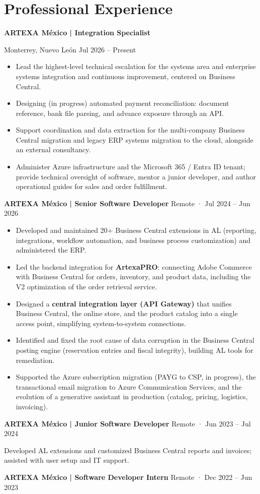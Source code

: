\documentclass[10pt,letterpaper]{article}
\begin{document}
\section{Professional Experience}
\textbf{ARTEXA México | Integration Specialist}\par
Monterrey, Nuevo León \hfill Jul 2026 -- Present\par
\begin{itemize}
\item Lead the highest-level technical escalation for the systems area and enterprise systems integration and continuous improvement, centered on Business Central.
\item Designing (in progress) automated payment reconciliation: document reference, bank file parsing, and advance exposure through an API.
\item Support coordination and data extraction for the multi-company Business Central migration and legacy ERP systems migration to the cloud, alongside an external consultancy.
\item Administer Azure infrastructure and the Microsoft 365 / Entra ID tenant; provide technical oversight of software, mentor a junior developer, and author operational guides for sales and order fulfillment.
\end{itemize}
\textbf{ARTEXA México | Senior Software Developer} \hfill Remote · Jul 2024 -- Jun 2026
\begin{itemize}
\item Developed and maintained 20+ Business Central extensions in AL (reporting, integrations, workflow automation, and business process customization) and administered the ERP.
\item Led the backend integration for \textbf{ArtexaPRO}: connecting Adobe Commerce with Business Central for orders, inventory, and product data, including the V2 optimization of the order retrieval service.
\item Designed a \textbf{central integration layer (API Gateway)} that unifies Business Central, the online store, and the product catalog into a single access point, simplifying system-to-system connections.
\item Identified and fixed the root cause of data corruption in the Business Central posting engine (reservation entries and fiscal integrity), building AL tools for remediation.
\item Supported the Azure subscription migration (PAYG to CSP, in progress), the transactional email migration to Azure Communication Services, and the evolution of a generative assistant in production (catalog, pricing, logistics, invoicing).
\end{itemize}
\textbf{ARTEXA México | Junior Software Developer} \hfill Remote · Jun 2023 -- Jul 2024\par
Developed AL extensions and customized Business Central reports and invoices; assisted with user setup and IT support.
\par\textbf{ARTEXA México | Software Developer Intern} \hfill Remote · Dec 2022 -- Jun 2023\par
\end{document}
